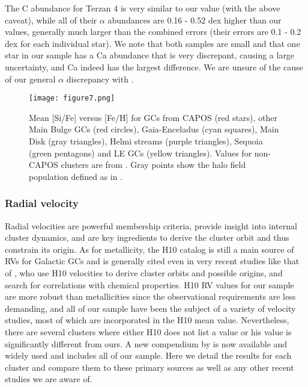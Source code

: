\documentclass[onecolumn]{aa}
\begin{document}
The \citet{Origlia2004} C abundance for Terzan 4 is very similar to our value (with the above caveat), while all of their $\alpha$ abundances are 
0.16 - 0.52 dex higher than our values, generally
much larger than the combined errors (their errors are 0.1 - 0.2 dex for each individual star). We note that both samples are small and that one star in our sample has a Ca abundance that is very discrepant, causing a large uncertainty, and Ca indeed has the largest difference. We are unsure of the cause of our general $\alpha$ discrepancy with \citet{Origlia2004}. 

\begin{figure*}
\centering
   \texttt{[image: figure7.png]}
      \caption{Mean [Si/Fe] versus [Fe/H] for GCs from CAPOS  (red stars), other Main Bulge GCs (red circles),  Gaia-Enceladus (cyan squares),  Main Disk (gray triangles), Helmi streams (purple triangles), Sequoia (green pentagons) and LE GCs (yellow triangles). Values for non-CAPOS clusters are from \citet{Horta2020}. Gray points show the halo field population defined as in \citet{Massari2019}.}
    \label{SiFe}
\end{figure*}

\subsubsection{Radial velocity}
Radial velocities are powerful membership criteria, provide insight into internal cluster dynamics, and are key ingredients to derive the cluster orbit and thus constrain its origin.
As for metallicity, the H10 catalog is still a main source of RVs for Galactic GCs and is generally cited even in very recent studies like that of \citet{Perez-Villegas2018, Perez-Villegas2020}, who use H10 velocities to derive cluster orbits and possible origins, and search for correlations with chemical properties. H10 RV values for our sample are more robust than metallicities since the observational requirements are less demanding, and all of our sample have been the subject of a variety of velocity studies, most of which are incorporated in the H10 mean value.  Nevertheless, there are several clusters where either H10 does not list a value or his value is significantly different from ours. A new compendium by \cite{Baumgardt2019} is now available and widely used and includes all of our sample.
Here we detail the results for each cluster and compare them to these primary sources as well as any other recent studies we are aware of.
\end{document}
